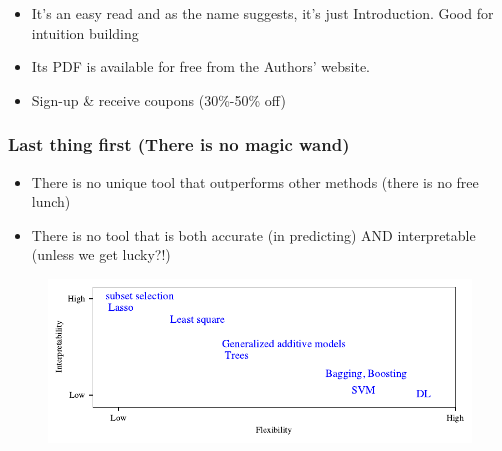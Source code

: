 \documentclass[serif, xcolor={dvipsnames}]{beamer} %
\begin{document}
\begin{frame}[t]
\begin{itemize}
\item It's an easy read and as the name suggests, it's just Introduction. Good for intuition building
\item Its PDF is available for free from the Authors' website.
\item Sign-up \& receive coupons (30\%-50\% off)
\end{itemize}

\end{frame}
\begin{frame}[t]
\frametitle{Last thing first (There is no magic wand)}

\begin{itemize}
\item There is no unique tool that outperforms other methods (there is no free lunch) 
\pause
\item There is no tool that is both accurate (in predicting) AND interpretable (unless we get lucky?!)
\end{itemize}
\pause

\begin{figure}[H]
\centering
\includegraphics[width=\linewidth]{model_flex_inter}
\end{figure}
\end{frame}
\end{document}
